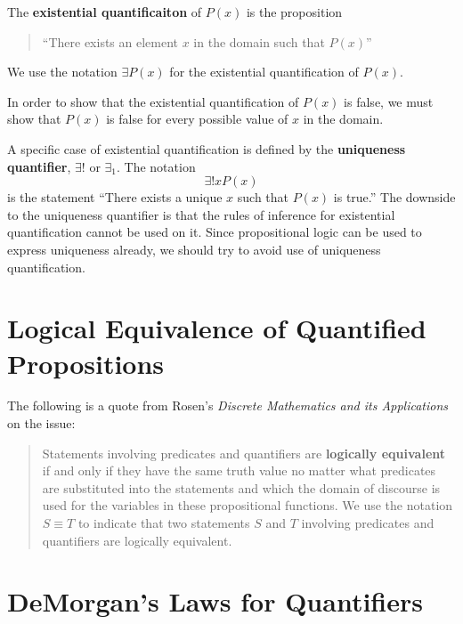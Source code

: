 \begin{defn}
  The \textbf{existential quantificaiton} of $P(x)$ is the proposition
  \begin{quote}
    ``There exists an element $x$ in the domain such that $P(x)$''
  \end{quote}
  We use the notation $\exists P(x)$ for the existential quantification of
  $P(x)$.%
\end{defn}

In order to show that the existential quantification of $P(x)$ is false, we must
show that $P(x)$ is false for every possible value of $x$ in the domain.

A specific case of existential quantification is defined by the
\textbf{uniqueness quantifier}, $\exists!$ or $\exists_1$. The notation
\[ \exists! x P(x) \]
is the statement ``There exists a unique $x$ such that $P(x)$ is true.'' The
downside to the uniqueness quantifier is that the rules of inference for
existential quantification cannot be used on it. Since propositional logic can
be used to express uniqueness already, we should try to avoid use of uniqueness
quantification.

\section{Logical Equivalence of Quantified Propositions}

The following is a quote from Rosen's \emph{Discrete Mathematics and its Applications} on the issue:

\begin{quote}
  Statements involving predicates and quantifiers are \textbf{logically
  equivalent} if and only if they have the same truth value no matter what
  predicates are substituted into the statements and which the domain of
  discourse is used for the variables in these propositional functions. We use the
  notation $S \equiv T$ to indicate that two statements $S$ and $T$ involving
  predicates and quantifiers are logically equivalent.

  \hfill\cite[p.~45]{rosen}
\end{quote}

\section{DeMorgan's Laws for Quantifiers}

